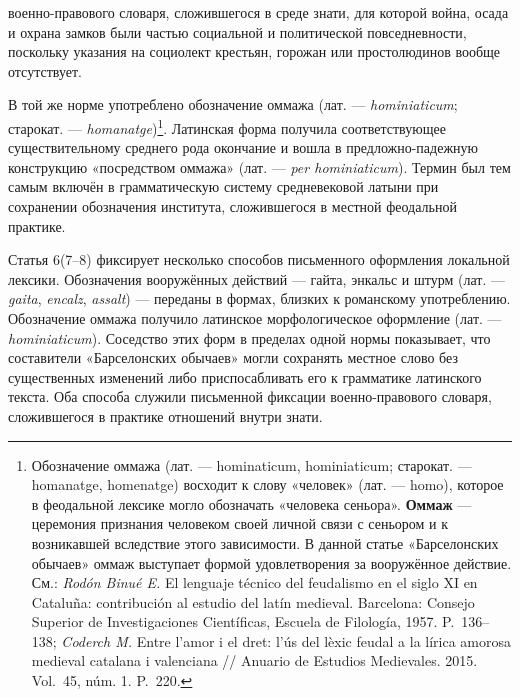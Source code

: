 военно-правового словаря, сложившегося в среде знати, для которой война, осада и охрана замков были частью социальной и политической повседневности, поскольку указания на социолект крестьян, горожан или простолюдинов вообще отсутствует.

В той же норме употреблено обозначение оммажа (лат. --- \emph{hominiaticum}; старокат. --- \emph{homanatge})\footnote{Обозначение оммажа (лат. --- hominaticum, hominiaticum; старокат. --- homanatge, homenatge) восходит к слову «человек» (лат. --- homo), которое в феодальной лексике могло обозначать «человека сеньора». \textbf{Оммаж} --- церемония признания человеком своей личной связи с сеньором и к возникавшей вследствие этого зависимости. В данной статье «Барселонских обычаев» оммаж выступает формой удовлетворения за вооружённое действие. См.: \emph{Rodón Binué E.} El lenguaje técnico del feudalismo en el siglo XI en Cataluña: contribución al estudio del latín medieval. Barcelona: Consejo Superior de Investigaciones Científicas, Escuela de Filología, 1957. P.~136--138; \emph{Coderch M. }Entre l’amor i el dret: l’ús del lèxic feudal a la lírica amorosa medieval catalana i valenciana // Anuario de Estudios Medievales. 2015. Vol.~45, núm. 1. P.~220.}. Латинская форма получила соответствующее существительному среднего рода окончание и вошла в предложно-падежную конструкцию «посредством оммажа» (лат. --- \emph{per hominiaticum}). Термин был тем самым включён в грамматическую систему средневековой латыни при сохранении обозначения института, сложившегося в местной феодальной практике.

Статья 6(7--8) фиксирует несколько способов письменного оформления локальной лексики. Обозначения вооружённых действий --- гайта, энкальс и штурм (лат. --- \emph{gaita}, \emph{encalz}, \emph{assalt}) --- переданы в формах, близких к романскому употреблению. Обозначение оммажа получило латинское морфологическое оформление (лат. --- \emph{hominiaticum}). Соседство этих форм в пределах одной нормы показывает, что составители «Барселонских обычаев» могли сохранять местное слово без существенных изменений либо приспосабливать его к грамматике латинского текста. Оба способа служили письменной фиксации военно-правового словаря, сложившегося в практике отношений внутри знати.

